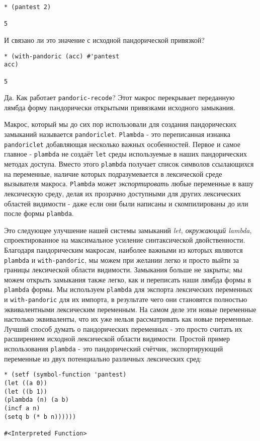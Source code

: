 \begin{verbatim}
* (pantest 2)

5
\end{verbatim}

И связано ли это значение с исходной пандорической привязкой?

\begin{verbatim}
* (with-pandoric (acc) #'pantest
acc)

5
\end{verbatim}

Да. Как работает \verb"pandoric-recode"? Этот макрос перекрывает переданную лямбда форму пандорически открытыми привязками исходного замыкания.

Макрос, который мы до сих пор использовали для создания пандорических замыканий называется \verb"pandoriclet". \verb"Plambda" - это переписанная изнанка \verb"pandoriclet" добавляющая несколько важных особенностей. Первое и самое главное - \verb"plambda" не создаёт \verb"let" среды используемые в наших пандорических методах доступа. Вместо этого \verb"plambda" получает список символов ссылающихся на переменные, наличие которых подразумевается в лексической среде вызывателя макроса. \verb"Plambda" может \emph{экспортировать} любые переменные в вашу лексическую среду, делая их прозрачно доступными для других лексических областей видимости - даже если они были написаны и скомпилированы до или после формы \verb"plambda".

Это следующее улучшение нашей системы замыканий \emph{let, окружающий lambda}, спроектированное на максимальное усиление синтаксической двойственности. Благодаря пандорическим макросам, наиболее важными из которых являются \verb"plambda" и \verb"with-pandoric", мы можем при желании легко и просто выйти за границы лексической области видимости. Замыкания больше не закрыты; мы можем открыть замыкания также легко, как и переписать наши лямбда формы в \verb"plambda" формы. Мы используем \verb"plambda" для экспорта лексических переменных и \verb"with-pandoric" для их импорта, в результате чего они становятся полностью эквивалентными лексическим переменным. На самом деле эти новые переменные настолько эквиваленты, что их уже нельзя рассматривать как новые переменные. Лучший способ думать о пандорических переменных - это просто считать их расширением исходной лексической области видимости. Простой пример использования \verb"plambda" - это пандорический счётчик, экспортирующий переменные из двух потенциально различных лексических сред:

\begin{verbatim}
* (setf (symbol-function 'pantest)
(let ((a 0))
(let ((b 1))
(plambda (n) (a b)
(incf a n)
(setq b (* b n))))))

#<Interpreted Function>
\end{verbatim}


